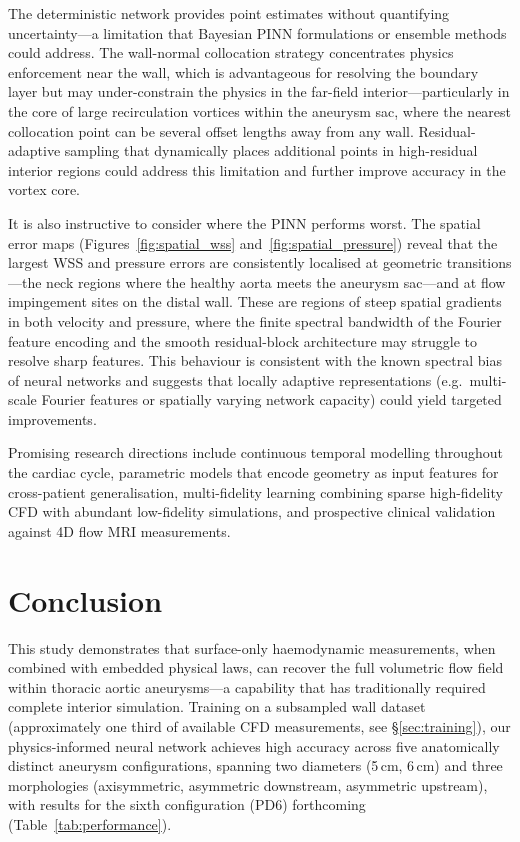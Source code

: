 \documentclass[11pt,a4paper]{article}
\begin{document}
The deterministic network provides point estimates without quantifying uncertainty---a limitation that Bayesian PINN formulations \cite{ref20} or ensemble methods could address. The wall-normal collocation strategy concentrates physics enforcement near the wall, which is advantageous for resolving the boundary layer but may under-constrain the physics in the far-field interior---particularly in the core of large recirculation vortices within the aneurysm sac, where the nearest collocation point can be several offset lengths away from any wall. Residual-adaptive sampling \cite{ref21} that dynamically places additional points in high-residual interior regions could address this limitation and further improve accuracy in the vortex core.

It is also instructive to consider where the PINN performs worst. The spatial error maps (Figures~\ref{fig:spatial_wss} and~\ref{fig:spatial_pressure}) reveal that the largest WSS and pressure errors are consistently localised at geometric transitions---the neck regions where the healthy aorta meets the aneurysm sac---and at flow impingement sites on the distal wall. These are regions of steep spatial gradients in both velocity and pressure, where the finite spectral bandwidth of the Fourier feature encoding and the smooth residual-block architecture may struggle to resolve sharp features. This behaviour is consistent with the known spectral bias of neural networks and suggests that locally adaptive representations (e.g.\ multi-scale Fourier features or spatially varying network capacity) could yield targeted improvements.

Promising research directions include continuous temporal modelling throughout the cardiac cycle, parametric models that encode geometry as input features for cross-patient generalisation, multi-fidelity learning combining sparse high-fidelity CFD with abundant low-fidelity simulations, and prospective clinical validation against 4D flow MRI measurements.

\section{Conclusion}

This study demonstrates that surface-only haemodynamic measurements, when combined with embedded physical laws, can recover the full volumetric flow field within thoracic aortic aneurysms---a capability that has traditionally required complete interior simulation. Training on a subsampled wall dataset (approximately one third of available CFD measurements, see \S\ref{sec:training}), our physics-informed neural network achieves high accuracy across five anatomically distinct aneurysm configurations, spanning two diameters (5\,cm, 6\,cm) and three morphologies (axisymmetric, asymmetric downstream, asymmetric upstream), with results for the sixth configuration (PD6) forthcoming (Table~\ref{tab:performance}).
\end{document}
